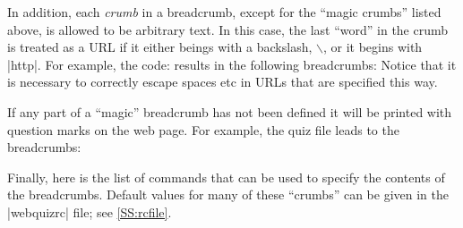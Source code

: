 \documentclass[svgnames]{article}
\newcommand\webquizrc{\index{webquizrc}\BashCode|webquizrc|\xspace}
\begin{document}
  \noindent
  In addition, each \textit{crumb} in a breadcrumb, except for the
  ``magic crumbs'' listed above, is allowed to be arbitrary text. In
  this case, the last ``word'' in the crumb is treated as a URL if it
  either beings with a backslash, $\backslash$, or it begins with
  \BashCode|http|.  For example, the code:
  \noindent
  results in the following breadcrumbs:
  Notice that it is necessary to correctly escape spaces etc in
  URLs that are specified this way.

  If any part of a ``magic'' breadcrumb has not been defined it will be
  printed with question marks on the web page. For example, the quiz
  file
  leads to the breadcrumbs:

  Finally, here is the list of \WebQuiz commands that can be used to
  specify the contents of the breadcrumbs. Default values for many of these
  ``crumbs'' can be given in the \webquizrc file; see \autoref{SS:rcfile}.
\end{document}
